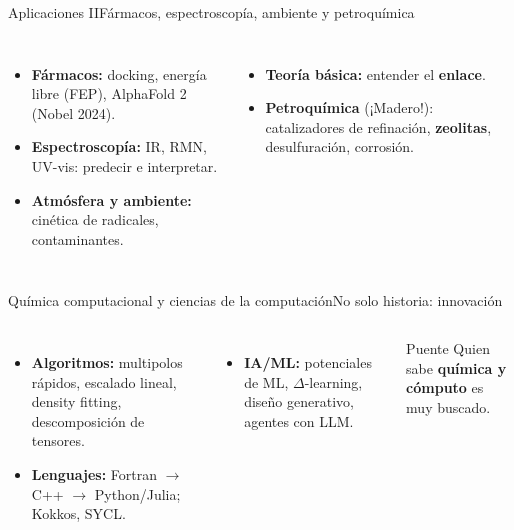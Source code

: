 \documentclass[aspectratio=169]{beamer}
\newcommand{\cplx}[1]{{\footnotesize\color{cookieMuted}#1}}
\begin{document}
\begin{frame}{Aplicaciones II}{Fármacos, espectroscopía, ambiente y petroquímica}
  \begin{columns}[T,onlytextwidth]
      \begin{itemize}\setlength\itemsep{4pt}
        \item \textbf{Fármacos:} docking, energía libre (FEP), AlphaFold 2 \cplx{(Nobel 2024)}.
        \item \textbf{Espectroscopía:} IR, RMN, UV-vis: predecir e interpretar.
        \item \textbf{Atmósfera y ambiente:} cinética de radicales, contaminantes.
      \end{itemize}
      \begin{itemize}\setlength\itemsep{4pt}
        \item \textbf{Teoría básica:} entender el \textbf{enlace}.
        \item \textbf{Petroquímica} (¡Madero!): catalizadores de refinación, \textbf{zeolitas}, desulfuración, corrosión.
      \end{itemize}
  \end{columns}
\end{frame}

\begin{frame}{Química computacional y ciencias de la computación}{No solo historia: innovación}
  \begin{columns}[T,onlytextwidth]
      \begin{itemize}\setlength\itemsep{4pt}
        \item \textbf{Algoritmos:} multipolos rápidos, escalado lineal, density fitting, descomposición de tensores.
        \item \textbf{Lenguajes:} Fortran $\to$ C++ $\to$ Python/Julia; Kokkos, SYCL.
      \end{itemize}
      \begin{itemize}\setlength\itemsep{4pt}
        \item \textbf{IA/ML:} potenciales de ML, $\Delta$-learning, diseño generativo, agentes con LLM.
      \end{itemize}
      \begin{exampleblock}{Puente}
        Quien sabe \textbf{química y cómputo} es muy buscado.
      \end{exampleblock}
  \end{columns}
\end{frame}
\end{document}
